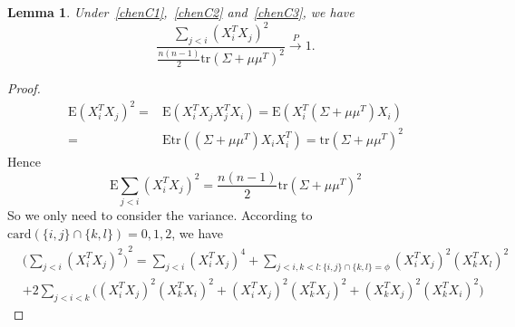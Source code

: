 \documentclass[review]{elsarticle}
\theoremstyle{plain}
\newtheorem{lemma}{Lemma}
\theoremstyle{definition}
\theoremstyle{remark}
\begin{document}
\begin{lemma}\label{ratioLemma}
    Under~\eqref{chenC1},~\eqref{chenC2} and~\eqref{chenC3}, we have
    \begin{equation}
        \frac{\sum_{j<i}{(X_i^T X_j)}^2}{\frac{n(n-1)}{2}\mathrm{tr} (\Sigma+\mu\mu^T)^2}
        \xrightarrow{P}1.
    \end{equation}
\end{lemma}
\begin{proof}
    \begin{equation}
        \begin{aligned}
            \mathrm{E}{(X_i^T X_j)}^2=&
            \mathrm{E}(X_i^T X_j X_j^T X_i)=
            \mathrm{E}(X_i^T (\Sigma+\mu \mu^T) X_i)\\
            =&
            \mathrm{E}\mathrm{tr}((\Sigma+\mu \mu^T) X_i X_i^T)=\mathrm{tr}{(\Sigma+\mu \mu^T)}^2
        \end{aligned}
    \end{equation}
    Hence
    \begin{equation}
        \mathrm{E}\sum_{j<i}{(X_i^T X_j)}^2=\frac{n(n-1)}{2}\mathrm{tr}{(\Sigma+\mu\mu^T)}^2
    \end{equation}
    So we only need to consider the variance. According to $\mathrm{card}(\{i,j\}\cap\{k,l\})=0,1,2$, we have
    \begin{equation}\label{eq:1}
    \begin{aligned}
        &{\big(\sum_{j<i}{(X_i^T X_j)}^2\big)}^2
        =
        \sum_{j<i}{(X_i^T X_j)}^4+
        \sum_{j<i,k<l:\{i,j\}\cap \{k,l\}=\phi}{(X_i^T X_j)}^2{(X_k^T X_l)}^2\\
        &+2\sum_{j<i<k}\big(
        {(X_i^T X_j)}^2{(X_k^T X_i)}^2+
{(X_i^T X_j)}^2{(X_k^T X_j)}^2+
{(X_k^T X_j)}^2{(X_k^T X_i)}^2
        \big)
    \end{aligned}
    \end{equation}



\end{proof}
\end{document}
